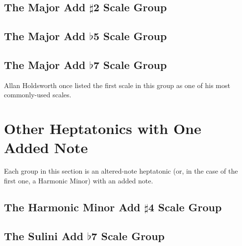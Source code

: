 \documentclass[english]{./gbook}
\begin{document}
\begin{large}
\subsection{The Major Add $\sharp$2 Scale Group}


\subsection{The Major Add $\flat$5 Scale Group}

\subsection{The Major Add $\flat$7 Scale Group}
Allan Holdsworth once listed the first scale in this group as one of his most commonly-used scales.


\section{Other Heptatonics with One Added Note}

Each group in this section is an altered-note heptatonic (or, in the case of the first one, a Harmonic Minor) with an added note.

\subsection{The Harmonic Minor Add $\sharp$4 Scale Group}

\subsection{The Sulini Add $\flat$7 Scale Group}


\end{large}
\end{document}
